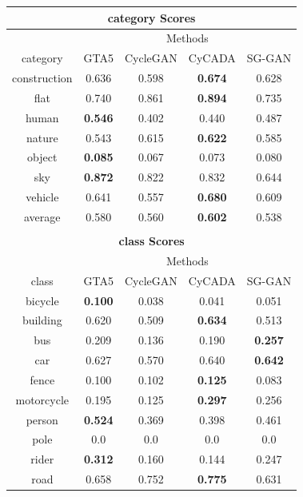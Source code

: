 \begin{table}
	\centering
	\begin{tabular}{|c|c|c|c|c|}
		\multicolumn{5}{c}{\textbf{category Scores}}\\
		\hline
		\multicolumn{1}{c}{} & \multicolumn{4}{c}{Methods}\\
		\cline{2-5}
		\multicolumn{1}{c|}{category} & GTA5 & CycleGAN & CyCADA & SG-GAN\\ 
		\hline
		construction & 0.636 & 0.598 & \textbf{0.674} & 0.628\\ 
		\hline 
		flat & 0.740 & 0.861 & \textbf{0.894} & 0.735\\ 
		\hline 
		human & \textbf{0.546} & 0.402 & 0.440 & 0.487\\ 
		\hline 
		nature & 0.543 & 0.615 & \textbf{0.622} & 0.585\\ 
		\hline 
		object & \textbf{0.085} & 0.067 & 0.073 & 0.080\\ 
		\hline 
		sky & \textbf{0.872} & 0.822 & 0.832 & 0.644\\ 
		\hline 
		vehicle & 0.641 & 0.557 & \textbf{0.680} & 0.609\\ 
		\hline \hline
		average & 0.580 & 0.560 & \textbf{0.602} & 0.538\\
		\hline
		\multicolumn{5}{c}{}\\
		\multicolumn{5}{c}{\textbf{class Scores}}\\
		\hline
		\multicolumn{1}{c}{} & \multicolumn{4}{c}{Methods}\\
		\cline{2-5}
		\multicolumn{1}{c|}{class} & GTA5 & CycleGAN & CyCADA & SG-GAN\\ 
		\hline
		bicycle & \textbf{0.100} & 0.038 & 0.041 & 0.051\\ 
		\hline 
		building & 0.620 & 0.509 & \textbf{0.634} & 0.513\\ 
		\hline 
		bus & 0.209 & 0.136 & 0.190 & \textbf{0.257}\\ 
		\hline 
		car & 0.627 & 0.570 & 0.640 & \textbf{0.642}\\ 
		\hline 
		fence & 0.100 & 0.102 & \textbf{0.125} & 0.083\\ 
		\hline 
		motorcycle & 0.195 & 0.125 & \textbf{0.297} & 0.256\\ 
		\hline 
		person & \textbf{0.524} & 0.369 & 0.398 & 0.461\\ 
		\hline 
		pole & 0.0 & 0.0 & 0.0 & 0.0\\ 
		\hline 
		rider & \textbf{0.312} & 0.160 & 0.144 & 0.247\\ 
		\hline 
		road & 0.658 & 0.752 & \textbf{0.775} & 0.631\\ 

\end{tabular}
\end{table}
